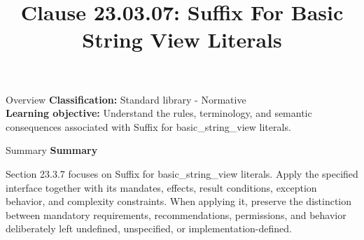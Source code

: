 \documentclass[10pt,letterpaper]{article}
\title{Clause 23.03.07: Suffix For Basic String View Literals}
\author{}
\date{}
\begin{document}
\maketitle
\begin{CornellOverviewBox}{Overview}
\textbf{Classification:} Standard library - Normative\\[2pt]
\textbf{Learning objective:} Understand the rules, terminology, and semantic consequences associated with Suffix for basic\_string\_view literals.
\end{CornellOverviewBox}\begin{CornellSummaryBox}{Summary}
{\sffamily\bfseries\color{Accent} Summary}\par\vspace{3pt}Section 23.3.7 focuses on Suffix for basic\_string\_view literals. Apply the specified interface together with its mandates, effects, result conditions, exception behavior, and complexity constraints. When applying it, preserve the distinction between mandatory requirements, recommendations, permissions, and behavior deliberately left undefined, unspecified, or implementation-defined.
\end{CornellSummaryBox}
\end{document}
